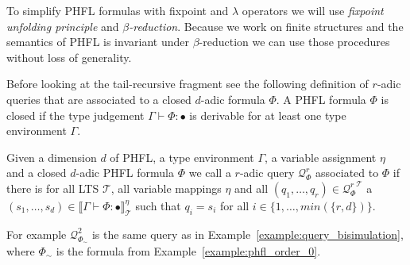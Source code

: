 
\begin{remark}
To simplify PHFL formulas with fixpoint and $\lambda$ operators we will use \emph{fixpoint unfolding principle} and \emph{$\beta$-reduction}. Because we work on finite structures and the semantics of PHFL is invariant under $\beta$-reduction we can use those procedures without loss of generality.
\end{remark}

Before looking at the tail-recursive fragment see the following definition of $r$-adic queries that are associated to a
closed $d$-adic formula $\Phi$. A PHFL formula $\Phi$ is closed if the type judgement $\Gamma \vdash \Phi \colon \bullet$ is derivable for at least one type environment $\Gamma$.

\begin{definition}
\label{definition:query_associated_to_formula}
    Given a dimension $d$ of PHFL, a type environment $\Gamma$, a variable assignment $\eta$ and a closed $d$-adic PHFL
    formula $\Phi$ we call a $r$-adic query $\mathcal{Q}^r_\Phi$ associated to $\Phi$ if there is for all LTS
    $\mathcal{T}$, all variable mappings $\eta$ and all $(q_1, \dots, q_r) \in {\mathcal{Q}^r_\Phi}^\mathcal{T}$ a $(s_1, \dots, s_d) \in
    \llbracket \Gamma \vdash \Phi \colon \bullet \rrbracket^\eta_\mathcal{T}$ such that $q_i = s_i$ for all $i \in
    \{1, \dots, min(\{r, d\})\}$.
\end{definition}

For example $\mathcal{Q}^2_{\Phi_\sim}$ is the same query as in Example~\ref{example:query_bisimulation}, where
$\Phi_\sim$ is the formula from Example~\ref{example:phfl_order_0}.

